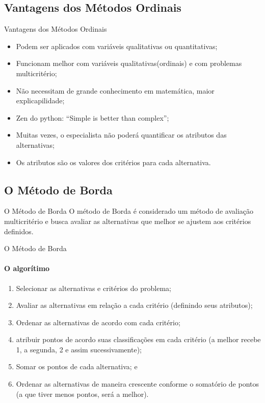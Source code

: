 \documentclass[aspectratio=169]{beamer}
\begin{document}
\subsection{Vantagens dos Métodos Ordinais}
\begin{frame}{Vantagens dos Métodos Ordinais}
    \begin{itemize}
\item Podem ser aplicados com variáveis qualitativas ou quantitativas;
\item Funcionam melhor com variáveis qualitativas(ordinais) e com problemas multicritério;
\item Não necessitam de grande conhecimento em matemática, maior explicapilidade;
\item Zen do python: “Simple is better than complex”;
\item Muitas vezes, o especialista não poderá quantificar os atributos das alternativas;
\item Os atributos são os valores dos critérios para cada alternativa.
    \end{itemize}
\end{frame}

\subsection{O Método de Borda}
\begin{frame}{O Método de Borda}
    O método de Borda é considerado um método de avaliação multicritério e busca avaliar as alternativas que melhor se ajustem aos critérios definidos. \cite{Barros2020}
\end{frame}

\begin{frame}{O Método de Borda}
\framesubtitle{O algorítimo}
   \begin{enumerate}
       \item Selecionar as alternativas e critérios do problema;
       \item Avaliar as alternativas em relação a cada critério (definindo seus atributos);
       \item Ordenar as alternativas de acordo com cada critério;
       \item atribuir pontos de acordo suas classificações em cada critério (a melhor recebe 1, a segunda, 2 e assim sucessivamente);
       \item Somar os pontos de cada alternativa; e
       \item Ordenar as alternativas de maneira crescente conforme o somatório de pontos (a que tiver menos pontos, será a melhor).
   \end{enumerate}
\end{frame}
\end{document}
